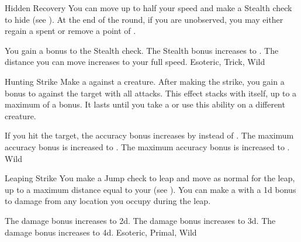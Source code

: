 \lowercase{\hypertarget{maneuver:Hidden Recovery}{}}\label{maneuver:Hidden Recovery}
\hypertarget{maneuver:Hidden Recovery}{}
\begin{freeability}{Hidden Recovery}
You can move up to half your speed and make a Stealth check to hide (see ).
At the end of the round, if you are unobserved, you may either regain a spent  or remove a point of .

\rankline
{} You gain a  bonus to the Stealth check.
 The Stealth bonus increases to .
 The distance you can move increases to your full speed.
 Esoteric, Trick, Wild
\end{freeability}
\vspace{0.25em}



\lowercase{\hypertarget{maneuver:Hunting Strike}{}}\label{maneuver:Hunting Strike}
\hypertarget{maneuver:Hunting Strike}{}
\begin{freeability}{Hunting Strike}
Make a  against a creature.
After making the strike, you gain a  bonus to  against the target with all attacks.
This effect stacks with itself, up to a maximum of a  bonus.
It lasts until you take a  or use this ability on a different creature.

\rankline
{} If you hit the target, the accuracy bonus increases by  instead of .
 The maximum accuracy bonus is increased to .
 The maximum accuracy bonus is increased to .
 Wild
\end{freeability}
\vspace{0.25em}



\lowercase{\hypertarget{maneuver:Leaping Strike}{}}\label{maneuver:Leaping Strike}
\hypertarget{maneuver:Leaping Strike}{}
\begin{apability}{Leaping Strike}
You make a Jump check to leap and move as normal for the leap, up to a maximum distance equal to your  (see ).
You can make a  with a \plus1d bonus to damage from any location you occupy during the leap.

\rankline
{} The damage bonus increases to \plus2d.
 The damage bonus increases to \plus3d.
 The damage bonus increases to \plus4d.
 Esoteric, Primal, Wild
\end{apability}
\vspace{0.25em}



